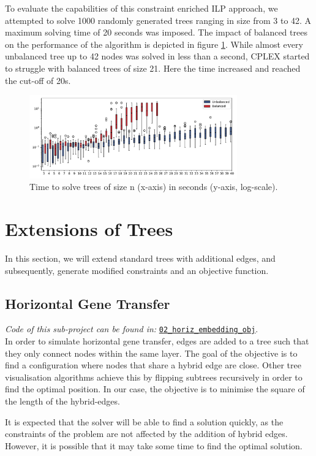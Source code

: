 \documentclass{article}
\begin{document}
To evaluate the capabilities of this constraint enriched \ac{ILP} approach, we attempted to solve 1000 randomly generated trees ranging in size from 3 to 42. A maximum solving time of 20 seconds was imposed. The impact of balanced trees on the performance of the algorithm is depicted in figure \ref{fig:runtime-tree}.
While almost every unbalanced tree up to 42 nodes was solved in less than a second, CPLEX started to struggle with balanced trees of size 21. Here the time increased and reached the cut-off of 20s.
\begin{figure}[H]
    \centering
    \includegraphics[width=0.8\textwidth]{figures/01_perf.pdf}
    \caption{Time to solve trees of size n (x-axis) in seconds (y-axis, log-scale).}
    \label{fig:runtime-tree}
\end{figure}
\section*{Extensions of Trees}
In this section, we will extend standard trees with additional edges, and subsequently, generate modified constraints and an objective function.

\subsection*{Horizontal Gene Transfer}
\textit{Code of this sub-project can be found in: }\href{https://github.com/not-a-feature/Layouting-Phylogenetic-Networks-using-MIQP/tree/main/02_horiz_embedding_obj}{\texttt{02\_horiz\_embedding\_obj}}.\\
In order to simulate horizontal gene transfer, edges are added to a tree such that they only connect nodes within the same layer. The goal of the objective is to find a configuration where nodes that share a hybrid edge are close. Other tree visualisation algorithms achieve this by flipping subtrees recursively in order to find the optimal position. In our case, the objective is to minimise the square of the length of the hybrid-edges.

It is expected that the solver will be able to find a solution quickly, as the constraints of the problem are not affected by the addition of hybrid edges. However, it is possible that it may take some time to find the optimal solution.
\end{document}

